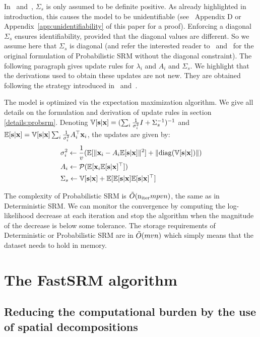 \documentclass{article}
\begin{document}
In~\cite{chen2015reduced} and~\cite{anderson2016enabling}, $\Sigma_s$ is only assumed to be definite positive.
%
As already highlighted in introduction, this causes the model to be
unidentifiable (see~\cite{richard2020modeling} Appendix D or Appendix~\ref{app:unidentifiability} of this paper for a proof). Enforcing a diagonal $\Sigma_s$ ensures identifiability, provided that the diagonal values are different.
%
So we assume here that $\Sigma_s$ is diagonal (and refer the interested reader
to~\cite{chen2015reduced} and~\cite{anderson2016enabling} for the original formulation of Probabilistic SRM
without the diagonal constraint). The following paragraph gives update rules for $\lambda_i$ and $A_i$ and $\Sigma_s$. We highlight that the derivations used to obtain these updates are not new. They are obtained following the strategy introduced in~\cite{anderson2016enabling} and~\cite{chen2015reduced}.
%



The model is optimized via the expectation maximization algorithm.
%
We give all details on the formulation and derivation of update rules in section \ref{details:probsrm}.
%
Denoting $\mathbb{V}[\mathbf{s} | \mathbf{x}] = (\sum_i \frac1{\sigma_i^2} I +
\Sigma_s^{-1})^{-1}$ and $\mathbb{E}[\mathbf{s} | \mathbf{x}] = \mathbb{V}[\mathbf{s} | \mathbf{x}] \sum_i \frac1{\sigma_i^2}
A_i^{\top}\mathbf{x}_i$, the updates are given by:
\begin{align}
  &\sigma_i^2 \leftarrow \frac1{v} (\mathbb{E}[\| \mathbf{x}_i - A_i \mathbb{E}[\mathbf{s}|\mathbf{x}]\|^2] + \| {\rm diag}(\mathbb{V}[\mathbf{s} | \mathbf{x}]) \|) \\
  &A_i \leftarrow \mathcal{P}(\mathbb{E}[\mathbf{x}_i \mathbb{E}[\mathbf{s}|\mathbf{x}]^{\top}]) \label{eq:psrm:Aiupdate} \\
  & \Sigma_s \leftarrow \mathbb{V}[\mathbf{s} | \mathbf{x}] + \mathbb{E}[\mathbb{E}[\mathbf{s} | \mathbf{x}] \mathbb{E}[\mathbf{s} | \mathbf{x}]^{\top}]
\end{align}


The complexity of Probabilistic SRM is $\tilde{O}(\mathrm{n_{iter}} mpvn)$, the same as in
Deterministic SRM.
%
We can monitor the convergence by computing the log-likelihood decrease at each iteration
and stop the algorithm when the magnitude of the decrease is below some
tolerance.
%
The storage requirements of Deterministic or Probabilistic SRM are in
$\tilde{O}(mvn)$ which simply means that the dataset needs to hold in memory.
%


\section{The FastSRM algorithm}

\subsection{Reducing the computational burden by the use of spatial decompositions}
\end{document}
